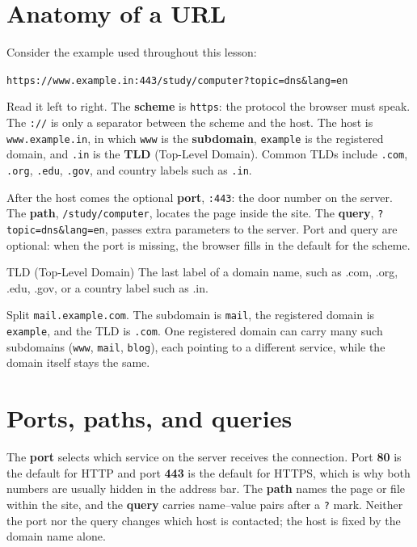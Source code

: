 \section{Anatomy of a URL}
Consider the example used throughout this lesson:
\begin{center}
\texttt{https://www.example.in:443/study/computer?topic=dns\&lang=en}
\end{center}
Read it left to right. The \textbf{scheme} is \texttt{https}: the protocol
the browser must speak. The \texttt{://} is only a separator between the
scheme and the host. The host is \texttt{www.example.in}, in which
\texttt{www} is the \textbf{subdomain}, \texttt{example} is the registered
domain, and \texttt{.in} is the \textbf{TLD} (Top-Level Domain). Common TLDs
include \texttt{.com}, \texttt{.org}, \texttt{.edu}, \texttt{.gov}, and
country labels such as \texttt{.in}.

After the host comes the optional \textbf{port}, \texttt{:443}: the door
number on the server. The \textbf{path}, \texttt{/study/computer}, locates
the page inside the site. The \textbf{query}, \texttt{?topic=dns\&lang=en},
passes extra parameters to the server. Port and query are optional: when the
port is missing, the browser fills in the default for the scheme.

\begin{definitionbox}{TLD (Top-Level Domain)}
The last label of a domain name, such as .com, .org, .edu, .gov, or a
country label such as .in.
\end{definitionbox}

\begin{example}
Split \texttt{mail.example.com}. The subdomain is \texttt{mail}, the
registered domain is \texttt{example}, and the TLD is \texttt{.com}. One
registered domain can carry many such subdomains (\texttt{www},
\texttt{mail}, \texttt{blog}), each pointing to a different service, while
the domain itself stays the same.
\end{example}

\section{Ports, paths, and queries}
The \textbf{port} selects which service on the server receives the
connection. Port \textbf{80} is the default for HTTP and port \textbf{443}
is the default for HTTPS, which is why both numbers are usually hidden in
the address bar. The \textbf{path} names the page or file within the site,
and the \textbf{query} carries name--value pairs after a \texttt{?} mark.
Neither the port nor the query changes which host is contacted; the host is
fixed by the domain name alone.

